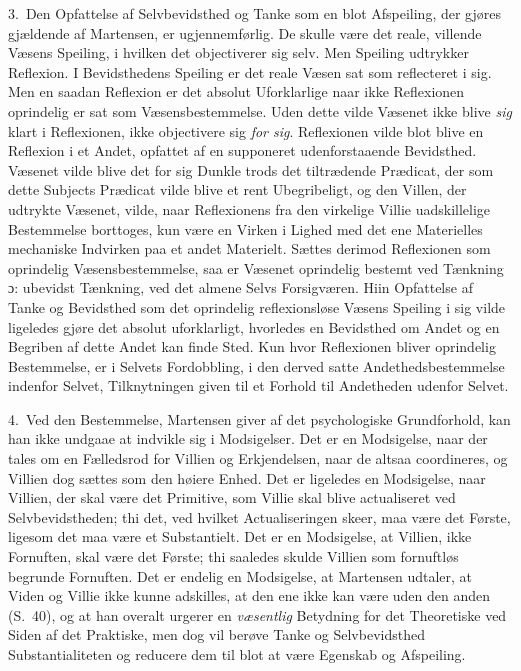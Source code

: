 \documentclass[12pt,a4paper]{book}
\newcommand{\opage}[1]{\marginnote{\footnotesize\textit{[#1]}}}
\begin{document}
3.\ Den Opfattelse af Selvbevidsthed og Tanke som en blot Afspeiling, der gjøres
gjældende af Martensen, er ugjennemførlig. De skulle være det reale, villende
Væsens Speiling, i hvilken det objectiverer sig selv. Men Speiling udtrykker
Reflexion. I Bevidsthedens Speiling er det reale Væsen sat som reflecteret i sig.
Men en saadan Reflexion \opage{54}er det absolut Uforklarlige naar ikke Reflexionen
oprindelig er sat som Væsensbestemmelse. Uden dette vilde Væsenet ikke blive \emph{sig} klart i Reflexionen, ikke objectivere sig \emph{for sig}. Reflexionen vilde blot blive en
Reflexion i et Andet, opfattet af en supponeret udenforstaaende Bevidsthed.
Væsenet vilde blive det for sig Dunkle trods det tiltrædende Prædicat, der som
dette Subjects Prædicat vilde blive et rent Ubegribeligt, og den Villen, der
udtrykte Væsenet, vilde, naar Reflexionens fra den virkelige Villie uadskillelige
Bestemmelse borttoges, kun være en Virken i Lighed med det ene Materielles
mechaniske Indvirken paa et andet Materielt. Sættes derimod Reflexionen som
oprindelig Væsensbestemmelse, saa er Væsenet oprindelig bestemt ved Tænkning ɔ:
ubevidst Tænkning, ved det almene Selvs Forsigværen. Hiin Opfattelse af Tanke og
Bevidsthed som det oprindelig reflexionsløse Væsens Speiling i sig vilde ligeledes
gjøre det absolut uforklarligt, hvorledes en Bevidsthed om Andet og en Begriben af
dette Andet kan finde Sted. Kun hvor Reflexionen bliver oprindelig Bestemmelse, er
i Selvets Fordobbling, i den derved satte Andethedsbestemmelse indenfor Selvet,
Tilknytningen given til et Forhold til Andetheden udenfor Selvet.

4.\ Ved den Bestemmelse, Martensen giver af det psychologiske Grundforhold, kan
han ikke undgaae at indvikle sig i Modsigelser. Det er en Modsigelse, naar der
tales om en Fælledsrod for Villien og Erkjendelsen, naar de altsaa coordineres, og
Villien dog sættes som den høiere Enhed. Det er ligeledes en Modsigelse, naar
Villien, der skal være det Primitive, som Villie skal blive actualiseret ved
Selvbevidstheden; thi det, ved hvilket Actualiseringen skeer, maa være det Første,
ligesom det maa være et Substantielt. Det er en Modsigelse, at Villien, ikke
Fornuften, skal være det Første; thi saaledes skulde Villien som fornuftløs
begrunde Fornuften. Det er endelig en Modsigelse, at Martensen udtaler, at Viden
og Villie ikke kunne adskilles, at den ene ikke kan være uden den anden (S.\ 40),
og at han overalt urgerer en \emph{væsentlig} Betydning for det Theore\opage{55}tiske ved
Siden af det Praktiske, men dog vil berøve Tanke og Selvbevidsthed
Substantialiteten og reducere dem til blot at være Egenskab og Afspeiling.
\end{document}
